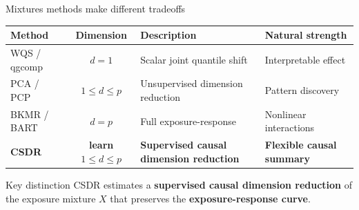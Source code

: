 \documentclass[
  ignorenonframetext,
  aspectratio=169,
  11pt]{beamer}
\begin{document}
\begin{frame}{Mixtures methods make different tradeoffs}
\label{mixtures-methods-make-different-tradeoffs}
\begin{center}
\scriptsize
\renewcommand{\arraystretch}{1.35}
\setlength{\tabcolsep}{4.5pt}
\begin{tabular}{@{}l c l l@{}}
\toprule
\textbf{Method} & \textbf{Dimension} & \textbf{Description} & \textbf{Natural strength} \\
\midrule
WQS / qgcomp & $d=1$ & Scalar joint quantile shift & Interpretable effect \\
PCA / PCP & $1\le d\le p$ & Unsupervised dimension reduction & Pattern discovery \\
BKMR / BART & $d=p$ & Full exposure-response & Nonlinear interactions \\
\textbf{CSDR} & \textbf{learn $1\le d\le p$} &
\textbf{Supervised causal dimension reduction} & \textbf{Flexible causal summary} \\
\bottomrule
\end{tabular}
\end{center}

\normalsize

\pause

\begin{alertblock}{Key distinction}
\label{key-distinction}
CSDR estimates a \textbf{supervised causal dimension reduction} of the
exposure mixture \(X\) that preserves the \textbf{exposure-response
curve}.
\end{alertblock}
\end{frame}
\end{document}
